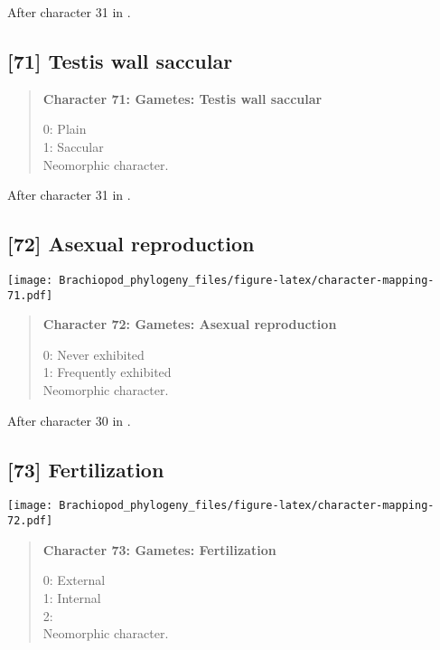 \documentclass[openany]{book}
\theoremstyle{definition}
\theoremstyle{definition}
\theoremstyle{definition}
\theoremstyle{remark}
\begin{document}
After character 31 in \citet{Haszprunar1996}.

\subsection*{{[}71{]} Testis wall saccular}\label{testis-wall-saccular}

\begin{quote}
\textbf{Character 71: Gametes: Testis wall saccular}

0: Plain\\
1: Saccular\\
Neomorphic character.
\end{quote}

After character 31 in \citet{Haszprunar1996}.

\subsection*{{[}72{]} Asexual reproduction}\label{asexual-reproduction}

\texttt{[image: Brachiopod\_phylogeny\_files/figure-latex/character-mapping-71.pdf]}

\begin{quote}
\textbf{Character 72: Gametes: Asexual reproduction}

0: Never exhibited\\
1: Frequently exhibited\\
Neomorphic character.
\end{quote}

After character 30 in \citet{Haszprunar1996}.

\subsection*{{[}73{]} Fertilization}\label{fertilization}

\texttt{[image: Brachiopod\_phylogeny\_files/figure-latex/character-mapping-72.pdf]}

\begin{quote}
\textbf{Character 73: Gametes: Fertilization}

0: External\\
1: Internal\\
2:\\
Neomorphic character.
\end{quote}
\end{document}
